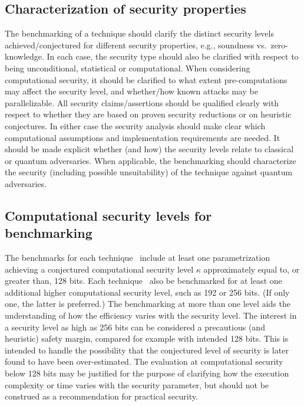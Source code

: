 \subsection{Characterization of security properties}
\label{security:efficiency:characterize-properties}
	The benchmarking of a technique should clarify the distinct security levels achieved/conjectured for different security properties, e.g., soundness vs.\ zero-knowledge.
	In each case, the security type should also be clarified with respect to being unconditional, statistical or computational.
	When considering computational security, it should be clarified to what extent pre-computations may affect the security level, and whether/how known attacks may be parallelizable.
	All security claims/assertions should be qualified clearly with respect to whether they are based on proven security reductions or on heuristic conjectures. 
    In either case the security analysis should make clear which computational assumptions and implementation requirements are needed. 
    It should be made explicit whether (and how) the security levels relate to classical or quantum adversaries. 
    When applicable, the benchmarking should characterize the security (including possible unsuitability) of the technique against quantum adversaries.



\subsection{Computational security levels for benchmarking}
\label{security:efficiency:comp-sec-levels}

	The benchmarks for each technique \shall\ include at least one parametrization achieving a conjectured computational security level $\kappa$ approximately equal to, or greater than, 128 bits.
	Each technique \should\ also be benchmarked for at least one additional higher computational security level, such as 192 or 256 bits.
    (If only one, the latter is preferred.)
    The benchmarking at more than one level aids the understanding of how the efficiency varies with the security level.
    The interest in a security level as high as 256 bits can be considered a 
precautious (and heuristic) safety margin, compared for example with intended 128 bits.
    This is intended to handle the possibility that the conjectured level of security is later found to have been over-estimated.
	The evaluation at computational security below 128 bits may be justified for the purpose 
of clarifying how the execution complexity or time varies with the security parameter, 
but should not be construed as a recommendation for practical security.


